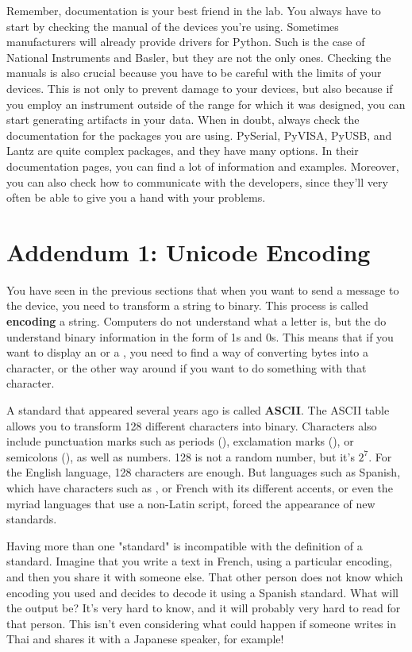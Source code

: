 Remember, documentation is your best friend in the lab. You always have to start by checking the manual of the devices you're using. Sometimes manufacturers will already provide drivers for Python. Such is the case of National Instruments and Basler, but they are not the only ones. Checking the manuals is also crucial because you have to be careful with the limits of your devices. This is not only to prevent damage to your devices, but also because if you employ an instrument outside of the range for which it was designed, you can start generating artifacts in your data. When in doubt, always check the documentation for the packages you are using. PySerial, PyVISA, PyUSB, and Lantz are quite complex packages, and they have many options. In their documentation pages, you can find a lot of information and examples. Moreover, you can also check how to communicate with the developers, since they'll very often be able to give you a hand with your problems.

\section{Addendum 1: Unicode Encoding}\label{sec:unicode}
You have seen in the previous sections that when you want to send a message to the device, you need to transform a string to binary. This process is called \textbf{encoding} a string. Computers do not understand what a letter is, but the do understand binary information in the form of 1s and 0s. This means that if you want to display an  or a , you need to find a way of converting bytes into a character, or the other way around if you want to do something with that character.

A standard that appeared several years ago is called \textbf{ASCII}. The ASCII table allows you to transform 128 different characters into binary. Characters also include punctuation marks such as periods (), exclamation marks (\py{!}), or semicolons (\py{:}), as well as numbers. 128 is not a random number, but it's $2^7$. For the English language, 128 characters are enough. But languages such as Spanish, which have characters such as , or French with its different accents, or even the myriad languages that use a non-Latin script, forced the appearance of new standards.

Having more than one "standard" is incompatible with the definition of a standard. Imagine that you write a text in French, using a particular encoding, and then you share it with someone else. That other person does not know which encoding you used and decides to decode it using a Spanish standard. What will the output be? It's very hard to know, and it will probably very hard to read for that person. This isn't even considering what could happen if someone writes in Thai and shares it with a Japanese speaker, for example!

